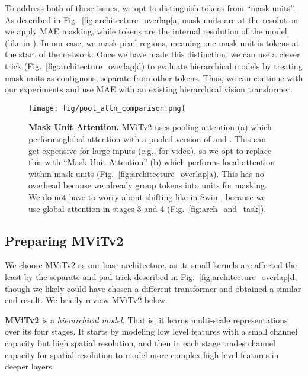 \documentclass[nohyperref]{article}
\renewcommand{\paragraph}[1]{\vspace{1.25mm}\noindent\textbf{#1}}
\theoremstyle{plain}
\theoremstyle{definition}
\theoremstyle{remark}
\begin{document}
To address both of these issues, we opt to distinguish tokens from ``mask units''. As described in Fig.~\ref{fig:architecture_overlap}\hyperref[fig:architecture_overlap]{a}, mask units are at the resolution we apply MAE masking, while tokens are the internal resolution of the model (like in \citet{maskfeat,xie2021simmim}). In our case, we mask  pixel regions, meaning one mask unit is  tokens at the start of the network. Once we have made this distinction, we can use a clever trick (Fig.~\ref{fig:architecture_overlap}\hyperref[fig:architecture_overlap]{d}) to evaluate hierarchical models by treating mask units as contiguous, separate from other tokens. Thus, we can continue with our experiments and use MAE with an existing hierarchical vision transformer.



\begin{figure}[t]
\centering
\texttt{[image: fig/pool\_attn\_comparison.png]}
\vspace{-.3em}
\caption{\textbf{Mask Unit Attention.} MViTv2 uses pooling attention (a) which performs global attention with a pooled version of  and . This can get expensive for large inputs (e.g., for video), so we opt to replace this with ``Mask Unit Attention'' (b) which performs local attention within mask units (Fig.~\ref{fig:architecture_overlap}\hyperref[fig:architecture_overlap]{a}). This has no overhead because we already group tokens into units for masking. We do not have to worry about shifting like in Swin \cite{swin}, because we use global attention in stages 3 and 4 (Fig.~\ref{fig:arch_and_task}).
}
\label{fig:pool_vs_mu_attn}
\vspace{-1em}
\end{figure}


\subsection{Preparing MViTv2} \label{subsec:approach_prep}

We choose MViTv2 as our base architecture, as its small  kernels are affected the least by the separate-and-pad trick described in Fig.~\ref{fig:architecture_overlap}\hyperref[fig:architecture_overlap]{d}, though we likely could have chosen a different transformer and obtained a similar end result. We briefly review MViTv2 below.

\paragraph{MViTv2} \cite{mvitv2} is a \textit{hierarchical model}. That is, it learns multi-scale representations over its four stages. It starts by modeling low level features with a small channel capacity but high spatial resolution, and then in each stage trades channel capacity for spatial resolution to model more complex high-level features in deeper layers.
\end{document}
